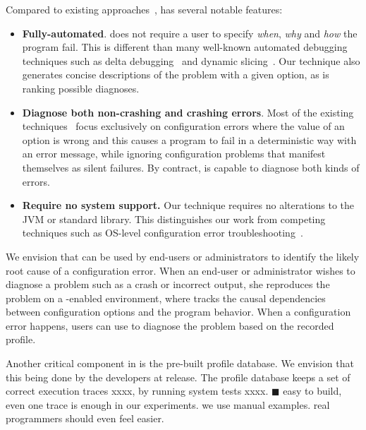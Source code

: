 
Compared to existing approaches~\cite{Zeller:2002:ICC, Zhang:2003:PDS,
Rabkin:2011:PPC, Whitaker:2004:CDS, Attariyan:2010:ACT, Wang:2004:AMT}, \ourtool has
several notable features:

\begin{itemize}
\item \textbf{Fully-automated}.
\ourtool does not require a user to specify
\textit{when}, \textit{why} and \textit{how} the program fail. This is
different than many well-known automated debugging techniques such
as delta debugging~\cite{Zeller:2002:ICC} and dynamic slicing~\cite{Zhang:2003:PDS}.
Our technique also generates concise descriptions of the problem
with a given option, as is ranking possible diagnoses.

\item \textbf{Diagnose both non-crashing and crashing errors}.
Most of the existing techniques~\cite{Rabkin:2011:PPC,
Whitaker:2004:CDS, Attariyan:2010:ACT} focus exclusively on configuration errors
where the value of an option is wrong and this causes a program
to fail in a deterministic way with an error message, while
ignoring configuration problems that manifest themselves as
silent failures. By contract, \ourtool is capable to diagnose
both kinds of errors.

\item \textbf{Require no system support.} Our technique requires no alterations to
the JVM or standard library. This distinguishes our work from
competing techniques such as OS-level configuration
error troubleshooting~\cite{Whitaker:2004:CDS}.%

\end{itemize}


We envision that \ourtool can be used by end-users or
administrators to identify the likely root cause of a configuration error.
When an end-user or administrator wishes to diagnose a
problem such as a crash or incorrect output, she
reproduces the problem on a \ourtool-enabled environment,
where \ourtool tracks the causal dependencies between
configuration options and the program behavior. 
When a configuration error happens, users can
use \ourtool to diagnose the problem based on the recorded profile.

Another critical component in \ourtool is the pre-built
profile database. We envision that this being done
by the developers at release. The profile database keeps
a set of correct execution traces xxxx, by running system
tests xxxx. $\blacksquare$ easy to build, even one trace
is enough in our experiments. we use manual examples. real programmers
should even feel easier.


